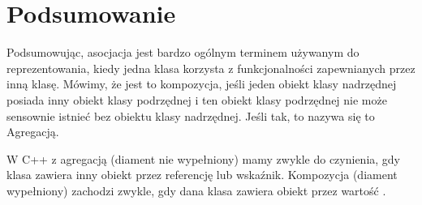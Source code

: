 \documentclass[a4paper,11pt]{report}
\begin{document}
\section{Podsumowanie}
Podsumowując, asocjacja jest bardzo ogólnym terminem używanym do reprezentowania, 
kiedy jedna klasa korzysta z funkcjonalności zapewnianych przez inną klasę. 
Mówimy, że jest to kompozycja, jeśli jeden obiekt klasy nadrzędnej posiada inny 
obiekt klasy podrzędnej i ten obiekt klasy podrzędnej nie może sensownie 
istnieć bez obiektu klasy nadrzędnej. Jeśli tak, to nazywa się to Agregacją.

W C++ z agregacją (diament nie wypełniony) mamy zwykle do czynienia, gdy 
klasa zawiera inny obiekt przez referencję lub wskaźnik. Kompozycja
(diament wypełniony) zachodzi zwykle, gdy dana klasa zawiera obiekt
przez wartość \cite{pointerToClass}.




\lstlistoflistings
\end{document}
